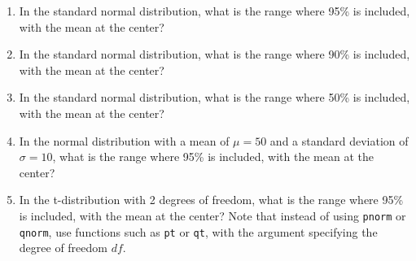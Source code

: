 \begin{enumerate}
	\item In the standard normal distribution, what is the range where 95\% is included, with the mean at the center?
	\item In the standard normal distribution, what is the range where 90\% is included, with the mean at the center?
	\item In the standard normal distribution, what is the range where 50\% is included, with the mean at the center?
	\item In the normal distribution with a mean of $\mu=50$ and a standard deviation of $\sigma=10$, what is the range where 95\% is included, with the mean at the center?
	\item In the t-distribution with 2 degrees of freedom, what is the range where 95\% is included, with the mean at the center? Note that instead of using \texttt{pnorm} or \texttt{qnorm}, use functions such as \texttt{pt} or \texttt{qt}, with the argument specifying the degree of freedom $df$.
\end{enumerate}
